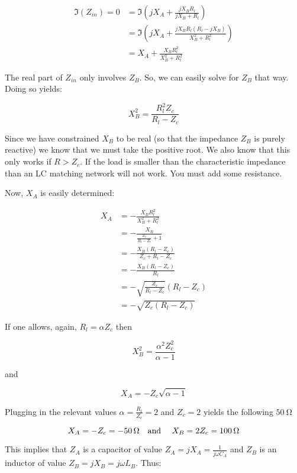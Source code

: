 \begin{align}
    \Im \left( Z_{in} \right) = 0 &= \Im \left( j X_A + \frac{j X_B
    R_l}{j X_B + R_l} \right)	 \\
    &= \Im \left( j X_A + \frac{j X_B R_l \left( R_l - j X_B \right)}{
    X_B^2 + R_l^2} \right) \\
    &= X_A + \frac{ X_B R_l^2}{ X_B^2 + R_l^2}
\end{align}

The real part of $Z_{in}$ only involves $Z_B$. So, we can easily solve for $Z_B$
that way. Doing so yields:

\[ 
    X_B^2 = \frac{R_l^2 Z_c}{R_l-Z_c}
\]

Since we have constrained $X_B$ to be real (so that the impedance $Z_B$ is purely
reactive) we know that we must take the positive root. We also know that this
only works if $R > Z_c$. If the load is smaller than the characteristic
impedance than an LC matching network will not work. You must add some
resistance.

Now, $X_A$ is easily determined:

\begin{align*}
    X_A &= -\frac{X_B R_l^2}{X_B^2 + R_l^2} \\
        &= - \frac{X_B}{\frac{Z_c}{R_l - Z_c} + 1} \\
        &= -\frac{X_B \left( R_l - Z_c \right)}{Z_c + R_l - Z_c} \\
        &= -\frac{X_B \left( R_l - Z_c \right)}{R_l} \\
        &= -\sqrt{\frac{Z_c}{R_l - Z_c}} \left( R_l - Z_c \right) \\
        &= -\sqrt{Z_c \left( R_l-Z_c \right)}
\end{align*}

If one allows, again, $R_l = \alpha Z_c$ then

\[ 
    X_B^2 = \frac{\alpha^2 Z_c^2}{\alpha - 1} 
\]

and 

\[ 
        X_A = -Z_c\sqrt{\alpha - 1}
\]


Plugging in the relevant values $\alpha = \frac{R_l}{Z_c} = 2$ and $Z_c = 2$
yields the following $\SI{50}{\ohm}$

\[ 
        X_A = - Z_c = -\SI{50}{\ohm} \text{\quad and \quad} X_B = 2 Z_c = \SI{100}{\ohm}
\]

This implies that $Z_A$ is a capacitor of value $Z_A = j X_A = \frac{1}{j\omega
C_A}$ and $Z_B$ is an inductor of value $Z_B = j X_B = j \omega L_B$. Thus:

